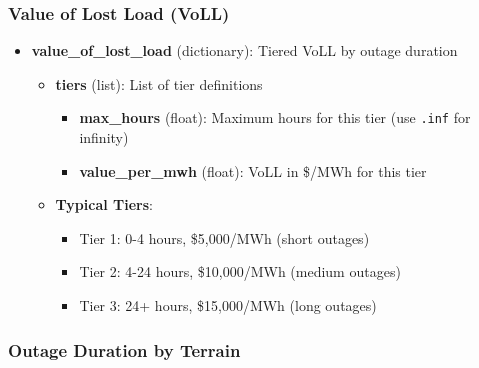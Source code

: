 \documentclass[ctcc_full_documentation.tex]{subfiles}
\begin{document}
\subsubsection{Value of Lost Load (VoLL)}

\begin{itemize}
    \item \textbf{value\_of\_lost\_load} (dictionary): Tiered VoLL by outage duration
    \begin{itemize}
        \item \textbf{tiers} (list): List of tier definitions
        \begin{itemize}
            \item \textbf{max\_hours} (float): Maximum hours for this tier (use \texttt{.inf} for infinity)
            \item \textbf{value\_per\_mwh} (float): VoLL in \$/MWh for this tier
        \end{itemize}
        \item \textbf{Typical Tiers}:
        \begin{itemize}
            \item Tier 1: 0-4 hours, \$5,000/MWh (short outages)
            \item Tier 2: 4-24 hours, \$10,000/MWh (medium outages)
            \item Tier 3: 24+ hours, \$15,000/MWh (long outages)
        \end{itemize}
    \end{itemize}
\end{itemize}

\subsubsection{Outage Duration by Terrain}
\end{document}
